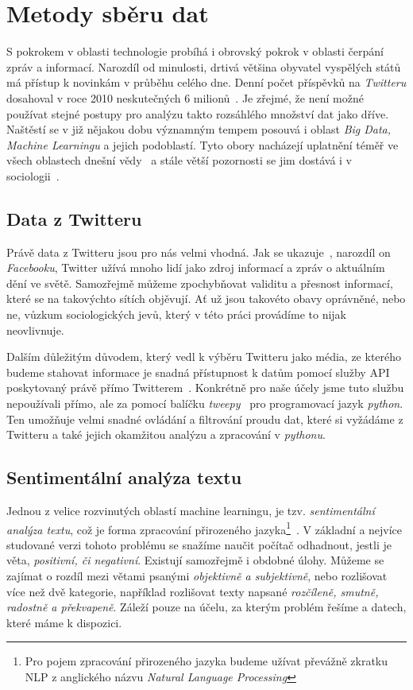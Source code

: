 \documentclass[12pt, a4paper]{article}
\numberwithin{equation}{section} 	%
\begin{document}
\newpage
\section{Metody sběru dat}
\noindent S pokrokem v oblasti technologie probíhá i obrovský pokrok v oblasti čerpání zpráv a informací. Narozdíl od minulosti, drtivá většina obyvatel vyspělých států má přístup k novinkám v průběhu celého dne. Denní počet příspěvků na \textit{Twitteru} dosahoval v roce 2010 neskutečných 6 milionů~\cite{Mathioudakis2010}. Je zřejmé, že není možné používat stejné postupy pro analýzu takto rozsáhlého množství dat jako dříve. Naštěstí se v již nějakou dobu významným tempem posouvá i oblast \textit{Big Data, Machine Learningu} a jejich podoblastí. Tyto obory nacházejí uplatnění téměř ve všech oblastech dnešní vědy~\cite{Huberman2012-2-15} a stále větší pozornosti se jim dostává i v sociologii~\cite{Tinati2014, McFarland2016, Shah2015-04-09}.

\subsection{Data z Twitteru}
\noindent Právě data z Twitteru jsou pro nás velmi vhodná. Jak se ukazuje~\cite{whyNotFb}, narozdíl on \textit{Facebooku}, Twitter užívá mnoho lidí jako zdroj informací a zpráv o aktuálním dění ve světě. Samozřejmě můžeme zpochybňovat validitu a přesnost informací, které se na takovýchto sítích objěvují. Ať už jsou takovéto obavy oprávněné, nebo ne, vůzkum sociologických jevů, který v této práci provádíme to nijak neovlivnuje.

Dalším důležitým důvodem, který vedl k výběru Twitteru jako média, ze kterého budeme stahovat informace je snadná přístupnost k datům pomocí služby API poskytovaný právě přímo Twitterem~\cite{twitterAPI}. Konkrétně pro naše účely jsme tuto službu nepoužívali přímo, ale za pomocí balíčku \textit{tweepy}~\cite{tweepy} pro programovací jazyk \textit{python}. Ten umožňuje velmi snadné ovládání a filtrování proudu dat, které si vyžádáme z Twitteru a také jejich okamžitou analýzu a zpracování v \textit{pythonu}.

\subsection{Sentimentální analýza textu}
\noindent Jednou z velice rozvinutých oblastí machine learningu, je tzv. \textit{sentimentální analýza textu}, což je forma zpracování přirozeného jazyka\footnote{Pro pojem zpracování přirozeného jazyka budeme užívat převážně zkratku NLP z anglického názvu \textit{Natural Language Processing}}~\cite{NLTKbook}. V základní a nejvíce studované verzi tohoto problému se snažíme naučit počítač odhadnout, jestli je věta, \textit{positivní, či negativní}. Existují samozřejmě i obdobné úlohy. Můžeme se zajímat o rozdíl mezi větami psanými \textit{objektivně a subjektivně}, nebo rozlišovat více než dvě kategorie, například rozlišovat texty napsané \textit{rozčíleně, smutně, radostně a překvapeně}. Záleží pouze na účelu, za kterým problém řešíme a datech, které máme k dispozici.
\end{document}

